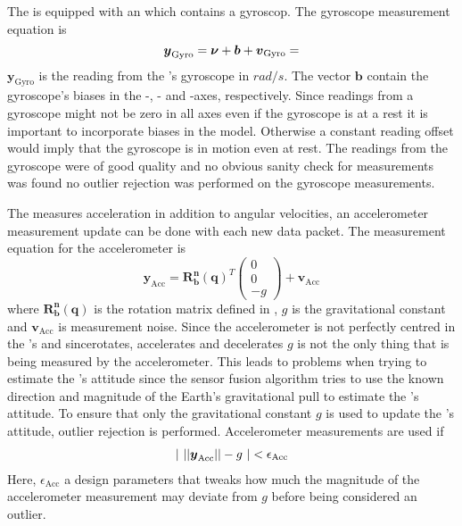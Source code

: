 The \abbrROV is equipped with an \abbrIMU which contains a gyroscop. The gyroscope measurement equation is 
\begin{equation}\label{eq:gyro}
\boldsymbol{y}_\text{Gyro}= \boldsymbol{\nu} + \boldsymbol{b} + \boldsymbol{v}_{\text{Gyro}} =
\end{equation}
 $\boldsymbol{y}_\text{Gyro}$ is the reading from the \abbrIMU's gyroscope in $rad/s$. The vector $\boldsymbol{b}$ contain the gyroscope's biases in the \xPosition-, \yPosition- and \zPosition-axes, respectively.
 Since readings from a gyroscope might not be zero in all axes even if the gyroscope is at a rest it is important to incorporate biases in the model. Otherwise a constant reading offset would imply that the gyroscope is in motion even at rest. The readings from the gyroscope were of good quality and no obvious sanity check for measurements was found no outlier rejection was performed on the gyroscope measurements. %

The \abbrIMU measures acceleration in addition to angular velocities, an accelerometer measurement update can be done with each new \abbrIMU data packet. The measurement equation for the accelerometer is
\begin{equation}
\boldsymbol{y}_{\text{Acc}} =
    \boldsymbol{R^n_b}(\boldsymbol{q})^T
    \begin{pmatrix}
    0\\
    0\\
    -g
    \end{pmatrix}
+ \boldsymbol{v}_{\text{Acc}}
\end{equation}
    where $\boldsymbol{R^n_b}(\boldsymbol{q})$ is the rotation matrix defined in , $g$ is the gravitational constant and $\boldsymbol{v}_{\text{Acc}}$ is measurement noise. Since the accelerometer is not perfectly centred in the \abbrROV's \abbrCG and since\abbrROV rotates, accelerates and decelerates $g$ is not the only thing that is being measured by the accelerometer. This leads to problems when trying to estimate the \abbrROV's attitude since the sensor fusion algorithm tries to use the known direction and magnitude of the Earth's gravitational pull to estimate the \abbrROV's attitude. To ensure that only the gravitational constant $g$ is used to update the \abbrROV's attitude, outlier rejection is performed. Accelerometer measurements are used if 
\begin{align}
    |~||
    \boldsymbol{y}_{\text{Acc}}
||
    -g
     ~| < \epsilon_{\text{Acc}}
\end{align}
Here, $\epsilon_{\text{Acc}}$ a design parameters that tweaks how much the magnitude of the accelerometer measurement may deviate from $g$ before being considered an outlier.


